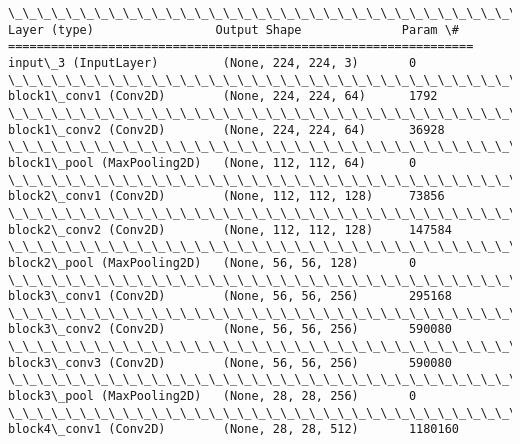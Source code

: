 \documentclass[11pt]{article}
\begin{document}
    \begin{Verbatim}[commandchars=\\\{\}]
\_\_\_\_\_\_\_\_\_\_\_\_\_\_\_\_\_\_\_\_\_\_\_\_\_\_\_\_\_\_\_\_\_\_\_\_\_\_\_\_\_\_\_\_\_\_\_\_\_\_\_\_\_\_\_\_\_\_\_\_\_\_\_\_\_
Layer (type)                 Output Shape              Param \#   
=================================================================
input\_3 (InputLayer)         (None, 224, 224, 3)       0         
\_\_\_\_\_\_\_\_\_\_\_\_\_\_\_\_\_\_\_\_\_\_\_\_\_\_\_\_\_\_\_\_\_\_\_\_\_\_\_\_\_\_\_\_\_\_\_\_\_\_\_\_\_\_\_\_\_\_\_\_\_\_\_\_\_
block1\_conv1 (Conv2D)        (None, 224, 224, 64)      1792      
\_\_\_\_\_\_\_\_\_\_\_\_\_\_\_\_\_\_\_\_\_\_\_\_\_\_\_\_\_\_\_\_\_\_\_\_\_\_\_\_\_\_\_\_\_\_\_\_\_\_\_\_\_\_\_\_\_\_\_\_\_\_\_\_\_
block1\_conv2 (Conv2D)        (None, 224, 224, 64)      36928     
\_\_\_\_\_\_\_\_\_\_\_\_\_\_\_\_\_\_\_\_\_\_\_\_\_\_\_\_\_\_\_\_\_\_\_\_\_\_\_\_\_\_\_\_\_\_\_\_\_\_\_\_\_\_\_\_\_\_\_\_\_\_\_\_\_
block1\_pool (MaxPooling2D)   (None, 112, 112, 64)      0         
\_\_\_\_\_\_\_\_\_\_\_\_\_\_\_\_\_\_\_\_\_\_\_\_\_\_\_\_\_\_\_\_\_\_\_\_\_\_\_\_\_\_\_\_\_\_\_\_\_\_\_\_\_\_\_\_\_\_\_\_\_\_\_\_\_
block2\_conv1 (Conv2D)        (None, 112, 112, 128)     73856     
\_\_\_\_\_\_\_\_\_\_\_\_\_\_\_\_\_\_\_\_\_\_\_\_\_\_\_\_\_\_\_\_\_\_\_\_\_\_\_\_\_\_\_\_\_\_\_\_\_\_\_\_\_\_\_\_\_\_\_\_\_\_\_\_\_
block2\_conv2 (Conv2D)        (None, 112, 112, 128)     147584    
\_\_\_\_\_\_\_\_\_\_\_\_\_\_\_\_\_\_\_\_\_\_\_\_\_\_\_\_\_\_\_\_\_\_\_\_\_\_\_\_\_\_\_\_\_\_\_\_\_\_\_\_\_\_\_\_\_\_\_\_\_\_\_\_\_
block2\_pool (MaxPooling2D)   (None, 56, 56, 128)       0         
\_\_\_\_\_\_\_\_\_\_\_\_\_\_\_\_\_\_\_\_\_\_\_\_\_\_\_\_\_\_\_\_\_\_\_\_\_\_\_\_\_\_\_\_\_\_\_\_\_\_\_\_\_\_\_\_\_\_\_\_\_\_\_\_\_
block3\_conv1 (Conv2D)        (None, 56, 56, 256)       295168    
\_\_\_\_\_\_\_\_\_\_\_\_\_\_\_\_\_\_\_\_\_\_\_\_\_\_\_\_\_\_\_\_\_\_\_\_\_\_\_\_\_\_\_\_\_\_\_\_\_\_\_\_\_\_\_\_\_\_\_\_\_\_\_\_\_
block3\_conv2 (Conv2D)        (None, 56, 56, 256)       590080    
\_\_\_\_\_\_\_\_\_\_\_\_\_\_\_\_\_\_\_\_\_\_\_\_\_\_\_\_\_\_\_\_\_\_\_\_\_\_\_\_\_\_\_\_\_\_\_\_\_\_\_\_\_\_\_\_\_\_\_\_\_\_\_\_\_
block3\_conv3 (Conv2D)        (None, 56, 56, 256)       590080    
\_\_\_\_\_\_\_\_\_\_\_\_\_\_\_\_\_\_\_\_\_\_\_\_\_\_\_\_\_\_\_\_\_\_\_\_\_\_\_\_\_\_\_\_\_\_\_\_\_\_\_\_\_\_\_\_\_\_\_\_\_\_\_\_\_
block3\_pool (MaxPooling2D)   (None, 28, 28, 256)       0         
\_\_\_\_\_\_\_\_\_\_\_\_\_\_\_\_\_\_\_\_\_\_\_\_\_\_\_\_\_\_\_\_\_\_\_\_\_\_\_\_\_\_\_\_\_\_\_\_\_\_\_\_\_\_\_\_\_\_\_\_\_\_\_\_\_
block4\_conv1 (Conv2D)        (None, 28, 28, 512)       1180160   

\end{Verbatim}
\end{document}

